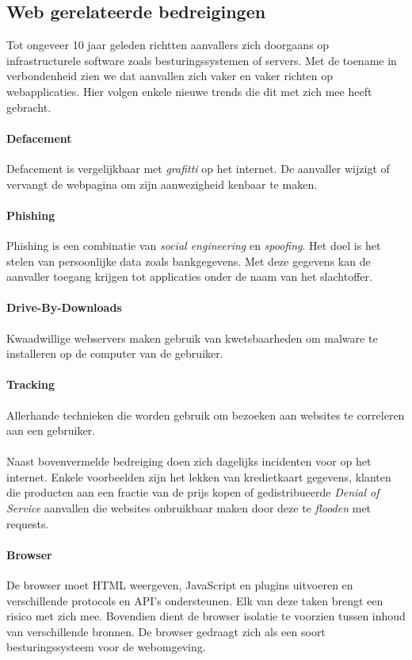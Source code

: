 \documentclass[../main.tex]{subfiles}
\begin{document}
\subsection{Web gerelateerde bedreigingen}
Tot ongeveer 10 jaar geleden richtten aanvallers zich doorgaans op infrastructurele software zoals besturingssystemen of servers. Met de toename in verbondenheid zien we dat aanvallen zich vaker en vaker richten op webapplicaties. Hier volgen enkele nieuwe trends die dit met zich mee heeft gebracht.

\paragraph{Defacement} Defacement is vergelijkbaar met \textit{grafitti} op het internet. De aanvaller wijzigt of vervangt de webpagina om zijn aanwezigheid kenbaar te maken.

\paragraph{Phishing} Phishing is een combinatie van \textit{social engineering} en \textit{spoofing}. Het doel is het stelen van persoonlijke data zoals bankgegevens. Met deze gegevens kan de aanvaller toegang krijgen tot applicaties onder de naam van het slachtoffer.

\paragraph{Drive-By-Downloads} Kwaadwillige webservers maken gebruik van kwetsbaarheden om malware te installeren op de computer van de gebruiker.

\paragraph{Tracking} Allerhande technieken die worden gebruik om bezoeken aan websites te correleren aan een gebruiker.
\\\\
Naast bovenvermelde bedreiging doen zich dagelijks incidenten voor op het internet. Enkele voorbeelden zijn het lekken van kredietkaart gegevens, klanten die producten aan een fractie van de prijs kopen of gedistribueerde \textit{Denial of Service} aanvallen die websites onbruikbaar maken door deze te \textit{flooden} met requests.



\paragraph{Browser} De browser moet HTML weergeven, JavaScript en plugins uitvoeren en verschillende protocols en API's ondersteunen. Elk van deze taken brengt een risico met zich mee. Bovendien dient de browser isolatie te voorzien tussen inhoud van verschillende bronnen. De browser gedraagt zich als een soort besturingssysteem voor de webomgeving.
\end{document}

